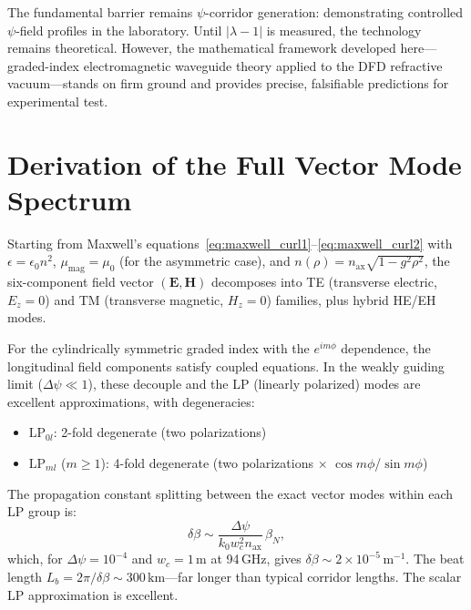 \documentclass[journal,twocolumn]{IEEEtran}
\begin{document}
The fundamental barrier remains $\psi$-corridor generation: demonstrating
controlled $\psi$-field profiles in the laboratory. Until $|\lambda - 1|$
is measured, the technology remains theoretical. However, the mathematical
framework developed here---graded-index electromagnetic waveguide theory
applied to the DFD refractive vacuum---stands on firm ground and provides
precise, falsifiable predictions for experimental test.

\appendix

\section{Derivation of the Full Vector Mode Spectrum}\label{app:vector}

Starting from Maxwell's equations~\eqref{eq:maxwell_curl1}--\eqref{eq:maxwell_curl2}
with $\epsilon = \epsilon_0 n^2$, $\mu_{\text{mag}} = \mu_0$ (for the asymmetric case),
and $n(\rho) = n_\text{ax}\sqrt{1 - g^2\rho^2}$, the six-component field
vector $(\mathbf{E}, \mathbf{H})$ decomposes into TE (transverse electric,
$E_z = 0$) and TM (transverse magnetic, $H_z = 0$) families, plus
hybrid HE/EH modes.

For the cylindrically symmetric graded index with the $e^{im\phi}$
dependence, the longitudinal field components satisfy coupled equations.
In the weakly guiding limit ($\Delta\psi \ll 1$), these decouple and the
LP (linearly polarized) modes are excellent approximations, with degeneracies:
\begin{itemize}
\item $\text{LP}_{0l}$: 2-fold degenerate (two polarizations)
\item $\text{LP}_{ml}$ ($m \geq 1$): 4-fold degenerate (two polarizations
$\times$ $\cos m\phi$/$\sin m\phi$)
\end{itemize}

The propagation constant splitting between the exact vector modes within
each LP group is:
\begin{equation}
\delta\beta \sim \frac{\Delta\psi}{k_0 w_c^2 n_\text{ax}}\,\beta_N,
\end{equation}
which, for $\Delta\psi = 10^{-4}$ and $w_c = 1\,\text{m}$ at 94\,GHz,
gives $\delta\beta \sim 2\times10^{-5}\,\text{m}^{-1}$. The beat length
$L_b = 2\pi/\delta\beta \sim 300\,\text{km}$---far longer than typical
corridor lengths. The scalar LP approximation is excellent.
\end{document}
